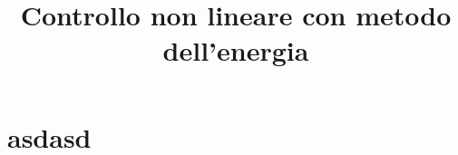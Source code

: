 \title{Controllo non lineare con metodo dell'energia}

\maketitle
\label{sec:nonlinear-control}



\section{asdasd}
